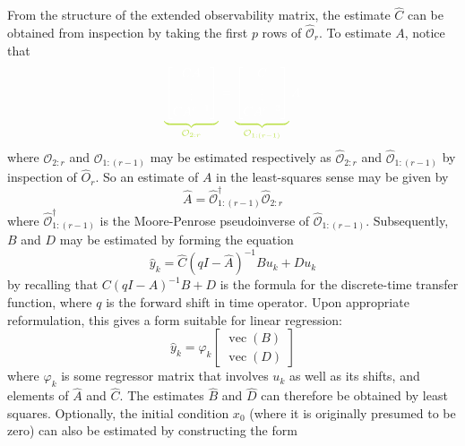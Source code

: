 \documentclass[11pt]{report} %
\begin{document}
From the structure of the extended observability matrix, the estimate $\widehat{C}$ can be obtained from inspection by taking the first $p$ rows of $\widehat{\mathcal{O}}_{r}$. To estimate $A$, notice that
\begin{equation}
\green\underbrace{\black \begin{bmatrix}CA\\
\vdots\\
CA^{r-1}
\end{bmatrix}}_{\green \mathcal{O}_{2:r}}\black = \green\underbrace{\black\begin{bmatrix}C\\
\vdots\\
CA^{r-2}
\end{bmatrix}}_{\green \mathcal{O}_{1:\left(r - 1\right)}}\black A
\end{equation}
where $\mathcal{O}_{2:r}$ and $\mathcal{O}_{1:\left(r - 1\right)}$ may be estimated respectively as $\widehat{\mathcal{O}}_{2:r}$ and $\widehat{\mathcal{O}}_{1:\left(r - 1\right)}$ by inspection of $\widehat{O}_{r}$. So an estimate of $A$ in the least-squares sense may be given by
\begin{equation}
\widehat{A} = \widehat{\mathcal{O}}_{1:\left(r - 1\right)}^{\dagger}\widehat{\mathcal{O}}_{2:r}
\end{equation}
where $\widehat{\mathcal{O}}_{1:\left(r - 1\right)}^{\dagger}$ is the Moore-Penrose pseudoinverse of $\widehat{\mathcal{O}}_{1:\left(r - 1\right)}$. Subsequently, $B$ and $D$ may be estimated by forming the equation
\begin{equation}
\widehat{y}_{k} = \widehat{C}\left(qI - \widehat{A}\right)^{-1}Bu_{k} + Du_{k}
\end{equation}
by recalling that $C\left(qI - A\right)^{-1}B + D$ is the formula for the discrete-time transfer function, where $q$ is the forward shift in time operator. Upon appropriate reformulation, this gives a form suitable for linear regression:
\begin{equation}
\widehat{y}_{k} = \varphi_{k}\begin{bmatrix}
\operatorname{vec}\left(B\right) \\ \operatorname{vec}\left(D\right)
\end{bmatrix}
\end{equation}
where $\varphi_{k}$ is some regressor matrix that involves $u_{k}$ as well as its shifts, and elements of $\widehat{A}$ and $\widehat{C}$. The estimates $\widehat{B}$ and $\widehat{D}$ can therefore be obtained by least squares. Optionally, the initial condition $x_{0}$ (where it is originally presumed to be zero) can also be estimated by constructing the form
\end{document}
